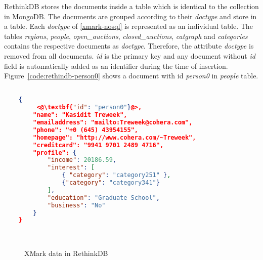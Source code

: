 RethinkDB stores the documents inside a table which is identical to the collection in MongoDB. 
The documents are grouped according to their \textit{doctype} and store in a table.
Each \textit{doctype} of \ref{xmark-nosql} is represented as an individual table. 
The tables \textit{regions}, \textit{people}, \textit{open\_auctions}, \textit{closed\_auctions}, \textit{catgraph} and \textit{categories} contains the respective documents as \textit{doctype}. Therefore, the attribute \textit{doctype} is removed from all documents.  \textit{id} is the primary key and any document without \textit{id} field is automatically added as an identifier during the time of insertion. Figure~\ref{code:rethindb-person0} shows a document with id \textit{person0} in \textit{people} table.


\newbox\rethinkdbXmarkDocument
\begin{lrbox}{\rethinkdbXmarkDocument}
\begin{lstlisting}[language=JSON,basicstyle =\scriptsize]

	{
		 <@\textbf{"id": "person0"}@>,
		"name": "Kasidit Treweek",
		"emailaddress": "mailto:Treweek@cohera.com",
		"phone": "+0 (645) 43954155",
		"homepage": "http://www.cohera.com/~Treweek",
		"creditcard": "9941 9701 2489 4716",
		"profile": {
			"income": 20186.59,
			"interest": [
			    { "category": "category251" },
				{"category": "category341"}
			],
			"education": "Graduate School",
			"business": "No"
		}
	}
\end{lstlisting}
\end{lrbox}


\newbox\rethinkdbXmarkChart
\begin{lrbox}{\rethinkdbXmarkChart}
\end{lrbox}

\begin{figure}[hhtp]
\centering
{}
\\
\centering
{}

\caption{XMark data in RethinkDB}
\label{xmark-rethinkdb-figure}
\end{figure}